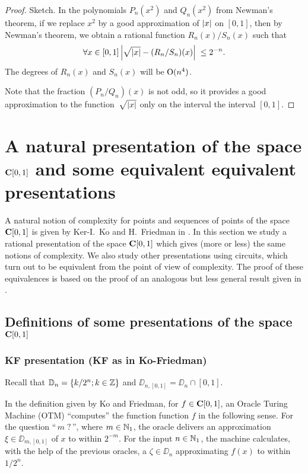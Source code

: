 \begin{proof} Sketch. 
In the polynomials $P_n(x^2)$ and $Q_n(x^2)$ from Newman's theorem, if we 
replace $x^2$ by a good approximation of $\left|{x}\right|$ on $[0,1]$, then 
by Newman's theorem, we obtain a rational function 
 $R_n(x)/S_n(x)$ such that 
\[
\forall x \in [0,1] \left|{\sqrt{ \left|{x}\right|} - (R_n/S_n)(x) }\right|\;  \leq 2^{-
n}.
\]
The degrees of $R_n(x)$ and $S_n(x)$ will be  ${\rm O}(n^4)$. 

\noindent 
Note that the fraction $(P_n/Q_n)(x)$ is not odd, so it provides a 
good approximation to the function~$\sqrt{ \left|{x}\right|}$ only on the interval 
the interval $[0,1]$. 
\end{proof}

\section[A natural presentation of the space \texorpdfstring{$\czu$}{C[0,1]}]{A natural presentation of the space \texorpdfstring{$\czu$}{C[0,1]} 
and some equivalent 
equivalent presentations}\label{sec4}

A natural notion of complexity for points and sequences of points 
of the space $\czu$ is given by Ker-I.\ Ko and H.~Friedman in \cite{KF82}. 
In this section we study a rational presentation of the space $\czu$ which gives (more or less) the same notions of complexity. We also study 
other presentations using circuits, which turn out to be equivalent from the point of view of complexity. 
The proof of these equivalences is based on the proof of an analogous but less general result given in \cite{Ho87,Ho90}. 

\subsection {Definitions of some presentations of the space 
 \texorpdfstring{$\czu$}{C[0,1]}}\label{subsec41}
 
\subsubsection{KF presentation (KF as in Ko-Friedman)}
Recall that $\mathbb {D}_n = \{ k/2^n ; k \in \mathbb {Z} \}$ and $\DD_{n,[0,1]} = 
\DD_n \cap [0,1]$. 

\noindent 
In the definition given by Ko and Friedman, for $f \in {{\bf C}[0,1]}$, an Oracle Turing Machine (OTM) ``computes'' the function function $f$ in the following sense. 
For the question ``$\,m\;?\,$'', where $m\in\mathbb {N}_1$, the oracle delivers an approximation $\xi \in\DD_{m,[0,1]}$ of $x$ to within $2^{-m}$. 
For the input $n \in \mathbb {N}_1$, the machine calculates, with the help of the previous oracles, a
$\zeta \in \DD_n$ approximating $f(x)$ to within $1/2^n$.

